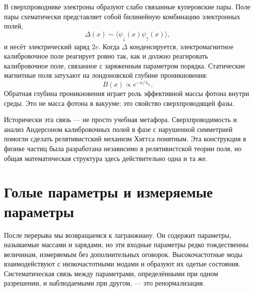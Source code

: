 В сверхпроводнике электроны образуют слабо связанные куперовские пары. Поле пары схематически представляет собой билинейную комбинацию электронных полей,
\begin{equation}
  \Delta(x)\sim\langle\psi_\downarrow(x)\psi_\uparrow(x)\rangle,
  \label{eq:l10-cooper-order-parameter}
\end{equation}
и несёт электрический заряд \(2e\). Когда \(\Delta\) конденсируется, электромагнитное калибровочное поле реагирует ровно так, как и должно реагировать калибровочное поле, связанное с заряженным параметром порядка. Статические магнитные поля затухают на лондоновской глубине проникновения:
\begin{equation}
  B(x)\propto e^{-x/\lambda_L}.
  \label{eq:l10-meissner-screening}
\end{equation}
Обратная глубина проникновения играет роль эффективной массы фотона внутри среды. Это не масса фотона в вакууме; это свойство сверхпроводящей фазы.

\begin{classroomqa}
\end{classroomqa}

Исторически эта связь — не просто учебная метафора.
Сверхпроводимость и анализ Андерсоном калибровочных полей в фазе с нарушенной
симметрией помогли сделать релятивистский механизм Хиггса понятным. Эта
конструкция в физике частиц была разработана независимо в релятивистской
теории поля, но общая математическая структура здесь действительно одна и та же.

\section{Голые параметры и измеряемые параметры}

После перерыва мы возвращаемся к лагранжиану. Он содержит
параметры, называемые массами и зарядами, но эти входные параметры редко
тождественны величинам, измеряемым без дополнительных оговорок. Высокочастотные
моды взаимодействуют с низкочастотными модами и образуют их одетые состояния.
Систематическая связь между параметрами, определёнными при одном разрешении, и
наблюдаемыми при другом, — это ренормализация.

